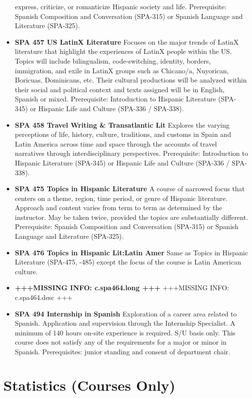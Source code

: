 \documentclass[
  letterpaper,
]{scrbook}
\begin{document}
\begin{itemize}
  express, criticize, or romanticize Hispanic society and life.
  Prerequisite: Spanish Composition and Conversation (SPA-315) or
  Spanish Language and Literature (SPA-325).
\item
  \textbf{SPA 457 US LatinX Literature} Focuses on the major trends of
  LatinX literature that highlight the experiences of LatinX people
  within the US. Topics will include bilingualism, code-switching,
  identity, borders, immigration, and exile in LatinX groups such as
  Chicano/a, Nuyorican, Boricuas, Dominicans, etc. Their cultural
  productions will be analyzed within their social and political context
  and texts assigned will be in English, Spanish or mixed. Prerequisite:
  Introduction to Hispanic Literature (SPA-345) or Hispanic Life and
  Culture (SPA-336 / SPA-338).
\item
  \textbf{SPA 458 Travel Writing \& Transatlantic Lit} Explores the
  varying perceptions of life, history, culture, traditions, and customs
  in Spain and Latin America across time and space through the accounts
  of travel narratives through interdisciplinary perspectives.
  Prerequisite: Introduction to Hispanic Literature (SPA-345) or
  Hispanic Life and Culture (SPA-336 / SPA-338).
\item
  \textbf{SPA 475 Topics in Hispanic Literature} A course of narrowed
  focus that centers on a theme, region, time period, or genre of
  Hispanic literature. Approach and content varies from term to term as
  determined by the instructor. May be taken twice, provided the topics
  are substantially different. Prerequisite: Spanish Composition and
  Conversation (SPA-315) or Spanish Language and Literature (SPA-325).
\item
  \textbf{SPA 476 Topics in Hispanic Lit:Latin Amer} Same as Topics in
  Hispanic Literature (SPA-475, -485) except the focus of the course is
  Latin American culture.
\item
  \textbf{+++MISSING INFO: c.spa464.long +++} +++MISSING INFO:
  c.spa464.desc +++
\item
  \textbf{SPA 494 Internship in Spanish} Exploration of a career area
  related to Spanish. Application and supervision through the Internship
  Specialist. A minimum of 140 hours on-site experience is required. S/U
  basis only. This course does not satisfy any of the requirements for a
  major or minor in Spanish. Prerequisites: junior standing and consent
  of department chair.
\end{itemize}

\section{Statistics (Courses Only)}\label{statistics-courses-only}
\end{document}

